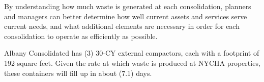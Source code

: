 
    By understanding how much waste is generated at each consolidation, planners and managers
    can better determine how well current assets and services serve current needs, and what additional 
    elements are necessary in order for each consolidation to operate as efficiently as possible. 

    Albany Consolidated has (3) 30-CY external compactors, each with a footprint of 192 square feet. Given the rate at which waste is produced at NYCHA properties, these containers will fill
    up in about (7.1) days.